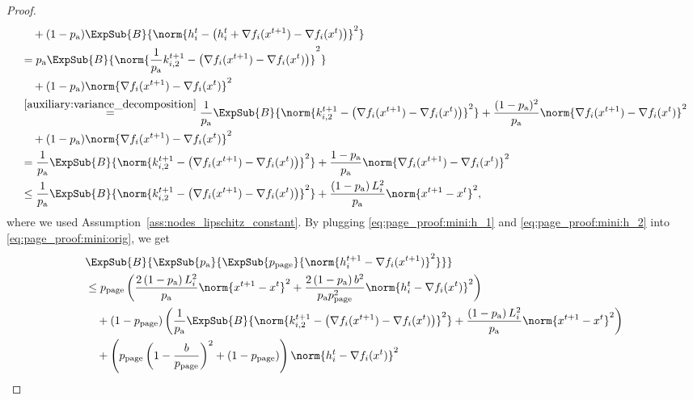 \documentclass{article}
\newcommand*{\probavailable}{\ensuremath{p_{\textnormal{a}}}}
\newcommand*{\probpage}{\ensuremath{p_{\text{page}}}}
\begin{document}
\begin{proof}
\begin{align}
    &\quad +(1 - \probavailable) \ExpSub{B}{\norm{h^{t}_{i} - \left(h^t_i + \nabla f_i(x^{t+1}) - \nabla f_i(x^{t})\right)}^2}\nonumber \\
    &= \probavailable \ExpSub{B}{\norm{\frac{1}{\probavailable} k^{t+1}_{i, 2} - \left(\nabla f_i(x^{t+1}) - \nabla f_i(x^{t})\right)}^2}\nonumber \\
    &\quad +(1 - \probavailable) \norm{\nabla f_i(x^{t+1}) - \nabla f_i(x^{t})}^2\nonumber \\
    &\overset{\eqref{auxiliary:variance_decomposition}}{=} \frac{1}{\probavailable} \ExpSub{B}{\norm{k^{t+1}_{i, 2} - \left(\nabla f_i(x^{t+1}) - \nabla f_i(x^{t})\right)}^2} + \frac{(1 - \probavailable)^2}{\probavailable} \norm{\nabla f_i(x^{t+1}) - \nabla f_i(x^{t})}^2\nonumber \\
    &\quad +(1 - \probavailable) \norm{\nabla f_i(x^{t+1}) - \nabla f_i(x^{t})}^2 \nonumber \\
    &= \frac{1}{\probavailable} \ExpSub{B}{\norm{k^{t+1}_{i, 2} - \left(\nabla f_i(x^{t+1}) - \nabla f_i(x^{t})\right)}^2} + \frac{1 - \probavailable}{\probavailable} \norm{\nabla f_i(x^{t+1}) - \nabla f_i(x^{t})}^2 \nonumber \\
    &\leq \frac{1}{\probavailable} \ExpSub{B}{\norm{k^{t+1}_{i, 2} - \left(\nabla f_i(x^{t+1}) - \nabla f_i(x^{t})\right)}^2} + \frac{\left(1 - \probavailable\right)L^2_i}{\probavailable} \norm{x^{t+1} - x^{t}}^2, \label{eq:page_proof:mini:h_2}
  \end{align}
  where we used Assumption~\ref{ass:nodes_lipschitz_constant}. By plugging \eqref{eq:page_proof:mini:h_1} and \eqref{eq:page_proof:mini:h_2} into \eqref{eq:page_proof:mini:orig}, we get
  \begin{align*}
    &\ExpSub{B}{\ExpSub{\probavailable}{\ExpSub{\probpage}{\norm{h^{t+1}_i - \nabla f_i(x^{t+1})}^2}}} \nonumber \\
    &\leq\probpage\left(\frac{2\left(1 - \probavailable\right)L_i^2}{\probavailable} \norm{x^{t+1} - x^{t}}^2 + \frac{2\left(1 - \probavailable\right)b^2}{\probavailable \probpage^2} \norm{h^t_i - \nabla f_i(x^{t})}^2\right) \\
    &\quad + (1 - \probpage)\left(\frac{1}{\probavailable} \ExpSub{B}{\norm{k^{t+1}_{i, 2} - \left(\nabla f_i(x^{t+1}) - \nabla f_i(x^{t})\right)}^2} + \frac{\left(1 - \probavailable\right)L^2_i}{\probavailable} \norm{x^{t+1} - x^{t}}^2\right) \\
    &\quad +\left(\probpage\left(1 - \frac{b}{\probpage}\right)^2 + (1 - \probpage)\right)\norm{h^{t}_i - \nabla f_i(x^{t})}^2 \\

\end{align*}
\end{proof}
\end{document}
